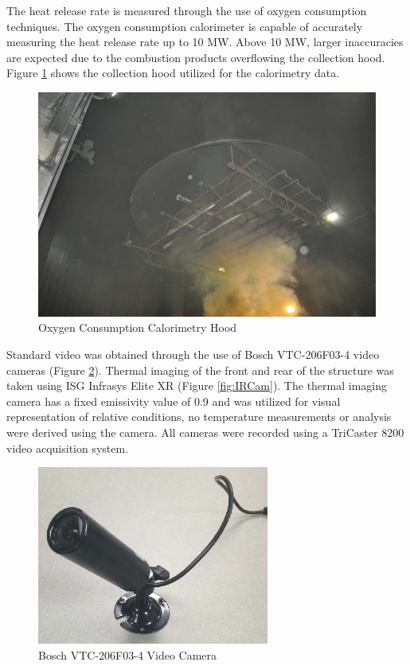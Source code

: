 \documentclass{article}
\begin{document}
The heat release rate is measured through the use of oxygen consumption techniques. The oxygen consumption calorimeter is capable of accurately measuring the heat release rate up to 10 MW. Above 10 MW, larger inaccuracies are expected due to the combustion products overflowing the collection hood. Figure \ref{fig:Hood} shows the collection hood utilized for the calorimetry data.

\begin{figure} [H]
	\centering
	\includegraphics[width = 5in]{0_Images/Instrumentation/Calorimetry_hood.jpg}
	\caption{Oxygen Consumption Calorimetry Hood}
	\label{fig:Hood}
\end{figure}

Standard video was obtained through the use of Bosch VTC-206F03-4 video cameras (Figure \ref{fig:BullettCam}). Thermal imaging of the front and rear of the structure was taken using ISG Infrasys Elite XR (Figure \ref{fig:IRCam}). The thermal imaging camera has a fixed emissivity value of 0.9 and was utilized for visual representation of relative conditions, no temperature measurements or analysis were derived using the camera. All cameras were recorded using a TriCaster 8200 video acquisition system.

\begin{figure} [H]
	\centering
	\includegraphics[width = 3in]{0_Images/Instrumentation/BullettCam.jpg}
	\caption{Bosch VTC-206F03-4 Video Camera}
	\label{fig:BullettCam}
\end{figure}
\end{document}
